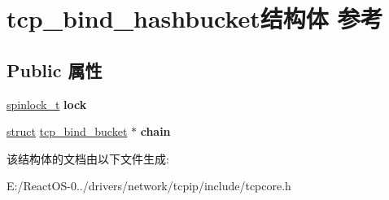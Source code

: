 \hypertarget{structtcp__bind__hashbucket}{}\section{tcp\+\_\+bind\+\_\+hashbucket结构体 参考}
\label{structtcp__bind__hashbucket}
\subsection*{Public 属性}
\begin{DoxyCompactItemize}
\item 
\mbox{\label{structtcp__bind__hashbucket_a5e97e3786ce82456e82031588f6d576d}} 
\hyperlink{structspinlock__t}{spinlock\+\_\+t} {\bfseries lock}
\item 
\mbox{\label{structtcp__bind__hashbucket_aea2fc006cb75fba46ec79ce89955e915}} 
\hyperlink{interfacestruct}{struct} \hyperlink{structtcp__bind__bucket}{tcp\+\_\+bind\+\_\+bucket} $\ast$ {\bfseries chain}
\end{DoxyCompactItemize}


该结构体的文档由以下文件生成\+:\begin{DoxyCompactItemize}
\item 
E\+:/\+React\+O\+S-\/0../drivers/network/tcpip/include/tcpcore.\+h\end{DoxyCompactItemize}
